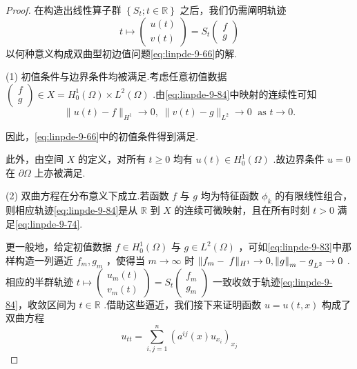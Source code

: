 \begin{proof}
在构造出线性算子群 $\left\{  {{S}_{t};t \in  \mathbb{R}}\right\}$ 之后，我们仍需阐明轨迹
\begin{equation}\tag{9.84}\label{eq:linpde-9-84}
t \mapsto  \left( \begin{array}{l} u\left( t\right) \\  v\left( t\right)  \end{array}\right)  = {S}_{t}\begin{pmatrix}f \\ g\end{pmatrix}
\end{equation}
以何种意义构成双曲型初边值问题\eqref{eq:linpde-9-66}的解.

\noindent (1) 初值条件与边界条件均被满足.考虑任意初值数据 $\begin{pmatrix}f \\ g\end{pmatrix}  \in  X = {H}_{0}^{1}\left( \Omega \right)  \times  {L}^{2}\left( \Omega \right)$ .由\eqref{eq:linpde-9-84}中映射的连续性可知
\[
\| u\left( t\right)  - f{\| }_{{H}^{1}} \rightarrow  0,\;\| v\left( t\right)  - g{\| }_{{L}^{2}} \rightarrow  0\;\text{ as }t \rightarrow  0.
\]

因此，\eqref{eq:linpde-9-66}中的初值条件得到满足.

此外，由空间 $X$ 的定义，对所有 $t \geq  0$ 均有 $u\left( t\right)  \in  {H}_{0}^{1}\left( \Omega \right)$ .故边界条件 $u = 0$ 在 $\partial \Omega$ 上亦被满足.

\noindent (2) 双曲方程在分布意义下成立.若函数 $f$ 与 $g$ 均为特征函数 ${\phi }_{k}$ 的有限线性组合，则相应轨迹\eqref{eq:linpde-9-84}是从 $\mathbb{R}$ 到 $X$ 的连续可微映射，且在所有时刻 $t > 0$ 满足\eqref{eq:linpde-9-74}.

更一般地，给定初值数据 $f \in  {H}_{0}^{1}\left( \Omega \right)$ 与 $g \in  {L}^{2}\left( \Omega \right)$ ，可如\eqref{eq:linpde-9-83}中那样构造一列逼近 ${f}_{m},{g}_{m}$ ，使得当 $m \rightarrow  \infty$ 时 $\| {f}_{m} - \; f{\| }_{{H}^{1}} \rightarrow  0,{\norm{g}_{m} - g}_{{L}^{2}} \rightarrow  0$ .相应的半群轨迹 $t \mapsto  \left( \begin{array}{l} {u}_{m}\left( t\right) \\  {v}_{m}\left( t\right)  \end{array}\right)  = {S}_{t}\left( \begin{array}{l} {f}_{m} \\  {g}_{m} \end{array}\right)$ 一致收敛于轨迹\eqref{eq:linpde-9-84}，收敛区间为 $t \in  \mathbb{R}$ .借助这些逼近，我们接下来证明函数 $u = u\left( {t,x}\right)$ 构成了双曲方程
\[
{u}_{tt} = \sum_{{i,j = 1}}^{n}{\left( {a}^{ij}\left( x\right) {u}_{{x}_{i}}\right) }_{{x}_{j}}
\]


\end{proof}
